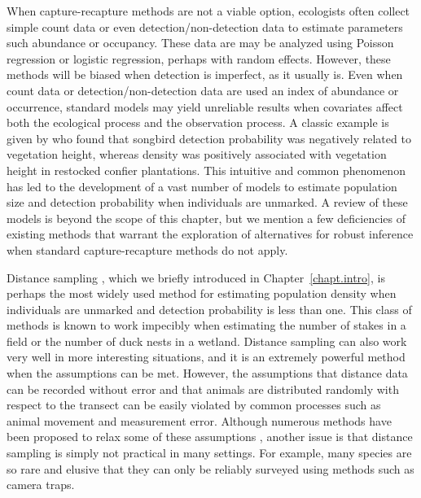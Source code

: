 When capture-recapture methods are not a viable option, ecologists
often collect simple count data or even detection/non-detection data
to estimate parameters such abundance or occupancy. These
data are may be analyzed using %
Poisson regression or logistic regression, perhaps with random
effects. %
However, these methods will be biased when detection is imperfect, as
it usually is. Even when count data or detection/non-detection data are
used an index of abundance or occurrence, standard models may yield
unreliable results when covariates affect both the ecological process
and the observation process. A classic example is given by
\citet{bibby_buckland:1987} who found that songbird detection
probability was negatively related to vegetation height, whereas
density was positively associated with vegetation height in restocked
confier plantations. This intuitive and common phenomenon has led to the
development of a vast number of models to estimate population size and
detection probability when individuals are unmarked. A review of these
models is beyond the scope of this
chapter, but we mention a few deficiencies of existing methods
that warrant the exploration of alternatives for robust inference when
standard capture-recapture methods do not apply.

Distance sampling \citep{buckland_etal:2001}, which we briefly
introduced in Chapter~\ref{chapt.intro},
is perhaps the most widely used method for
estimating population density when individuals are unmarked and
detection probability is less than one. This class of methods is known
to work impecibly when estimating the number of stakes in a field or
the number of duck nests in a wetland. Distance sampling can also work very well in
more interesting situations, and it is an extremely powerful method when
the assumptions can be met. However, the assumptions that distance
data can be recorded without error and that animals are distributed
randomly with respect to the transect can be easily violated by
common processes such as animal movement and measurement
error. Although numerous methods have been proposed to
relax some of these assumptions
\citet{royle_etal:2004, borchers_etal:1998, johnson_etal:2010,
  chandler_etal:2011},
another issue is that distance
sampling is simply not practical in many settings. For example, many
species are so rare and elusive that they can only be reliably
surveyed using methods such as camera traps.


